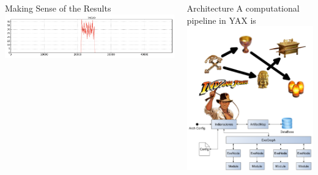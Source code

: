 \documentclass[final,t]{beamer}
\begin{document}
\begin{frame}{}
\begin{columns}[t]
\begin{column}{.3\linewidth}
\begin{block}{Making Sense of the Results}
        \includegraphics[width=1\linewidth]{assets/coverage_plot_bad}\newline\newline
        \end{block}

    \end{column}


    \begin{column}{.3\linewidth}
        \begin{block}{Architecture}
            A computational pipeline in YAX is\\
            \includegraphics[width=1\linewidth]{assets/arch}\newline\newline


\end{block}
\end{column}
\end{columns}
\end{frame}
\end{document}
